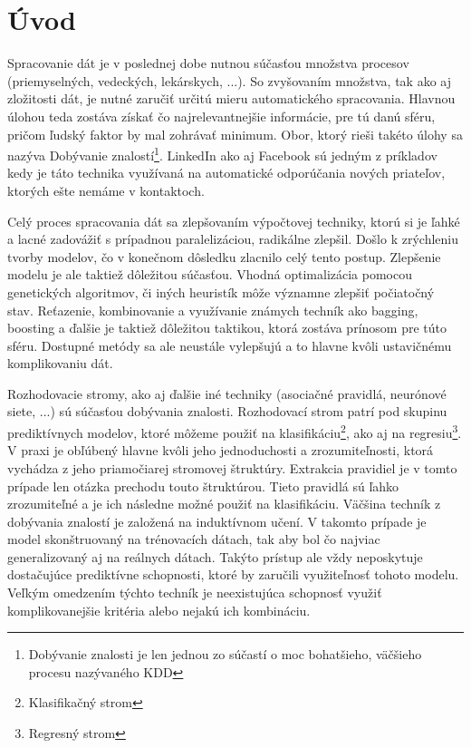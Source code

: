 \chapter{Úvod}
\setlength{\parskip}{0.5em}
\setlength{\parindent}{0cm}
Spracovanie dát je v poslednej dobe nutnou súčasťou množstva procesov (priemyselných, vedeckých, lekárskych, ...). So zvyšovaním množstva, tak ako aj zložitosti dát, je nutné zaručiť určitú mieru automatického spracovania. Hlavnou úlohou teda zostáva získať čo najrelevantnejšie informácie, pre tú danú sféru, pričom ľudský faktor by mal zohrávať minimum. Obor, ktorý rieši takéto úlohy sa nazýva Dobývanie znalostí\footnote{Dobývanie znalosti je len jednou zo súčastí o moc bohatšieho, väčšieho procesu nazývaného KDD}. LinkedIn ako aj Facebook sú jedným z príkladov kedy je táto technika využívaná na automatické odporúčania nových priateľov, ktorých ešte nemáme v kontaktoch.

Celý proces spracovania dát sa zlepšovaním výpočtovej techniky, ktorú si je ľahké a lacné zadovážiť s prípadnou paralelizáciou, radikálne zlepšil. Došlo k zrýchleniu tvorby modelov, čo v konečnom dôsledku zlacnilo celý tento postup. Zlepšenie modelu je ale taktiež dôležitou súčasťou. Vhodná optimalizácia pomocou genetických algoritmov, či iných heuristík môže významne zlepšiť počiatočný stav. Reťazenie, kombinovanie a využívanie známych techník ako bagging, boosting a ďalšie je taktiež dôležitou taktikou, ktorá zostáva prínosom pre túto sféru. Dostupné metódy sa ale neustále vylepšujú a to hlavne kvôli ustavičnému komplikovaniu dát.

Rozhodovacie stromy, ako aj ďalšie iné techniky (asociačné pravidlá, neurónové siete, ...) sú súčasťou dobývania znalosti. Rozhodovací strom patrí pod skupinu prediktívnych modelov, ktoré môžeme použiť na klasifikáciu\footnote{Klasifikačný strom}, ako aj na regresiu\footnote{Regresný strom}. V praxi je obľúbený hlavne kvôli jeho jednoduchosti a zrozumiteľnosti, ktorá vychádza z jeho priamočiarej stromovej štruktúry. Extrakcia pravidiel je v tomto prípade len otázka prechodu touto štruktúrou. Tieto pravidlá sú ľahko zrozumiteľné a je ich následne možné použiť na klasifikáciu. Väčšina techník z dobývania znalostí je založená na induktívnom učení. V takomto prípade je model skonštruovaný na trénovacích dátach, tak aby bol čo najviac generalizovaný aj na reálnych dátach. Takýto prístup ale vždy neposkytuje dostačujúce prediktívne schopnosti, ktoré by zaručili využiteľnosť tohoto modelu. Veľkým omedzením týchto techník je neexistujúca schopnosť využiť komplikovanejšie kritéria alebo nejakú ich kombináciu.

